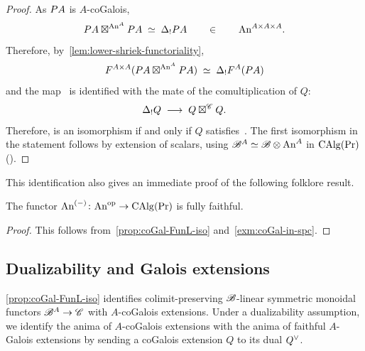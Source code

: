 \documentclass[english,svgnames,table]{article}
\begin{document}
\begin{proof}
        As $P A$ is $A$-coGalois, 
        \begin{equation*}
            P A \boxtimes^{\mathrm{An}^A} P A \;\simeq\; \Delta_! P A \qquad \in \qquad \mathrm{An}^{A \times A \times A}.
        \end{equation*}
        Therefore, by~\cref{lem:lower-shriek-functoriality},
        \begin{equation*}
            F^{A \times A} (P A \boxtimes^{\mathrm{An}^A} P A) \;\simeq\; \Delta_! F^A(P A)
        \end{equation*}
        and the map~ is identified with the mate of the comultiplication of $Q$:
        \begin{equation*}
            \Delta_! Q \;\longrightarrow\; Q \boxtimes^{\mathscr{C}} Q.
        \end{equation*}
        Therefore,  is an isomorphism if and only if $Q$ satisfies~.
        The first isomorphism in the statement follows by extension of scalars, using $\mathscr{B}^A \simeq \mathscr{B} \otimes \mathrm{An}^A$ in $\operatorname{CAlg}(\operatorname{Pr})$ (\cite[Corollary~3.4.1.7 and Proposition~3.2.4.7]{Lurie-HA}).
    \end{proof}

    This identification also gives an immediate proof of the following folklore result.
    \begin{corollary}
        The functor $\mathrm{An}^{(-)}\colon \mathrm{An}^{\mathrm{op}} \to \operatorname{CAlg}(\operatorname{Pr})$ is fully faithful.
    \end{corollary}
    \begin{proof}
        This follows from~\cref{prop:coGal-FunL-iso} and~\cref{exm:coGal-in-spc}.
    \end{proof}


    
\subsection{Dualizability and Galois extensions}
\label{subsec:norm-and-coGalois}
    \cref{prop:coGal-FunL-iso} identifies colimit-preserving $\mathscr{B}$-linear symmetric monoidal functors $\mathscr{B}^A \to \mathscr{C}$ with $A$-coGalois extensions.
    Under a dualizability assumption, we identify the anima of $A$-coGalois extensions with the anima of faithful $A$-Galois extensions by sending a coGalois extension $Q$ to its dual $Q^{\vee}$.
\end{document}
